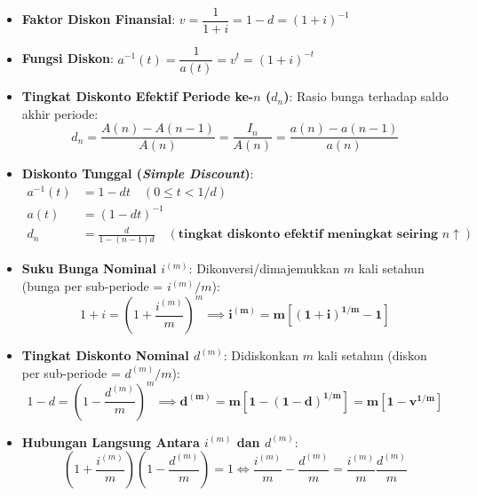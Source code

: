 \documentclass[10pt,a4paper]{article}
\begin{document}
\begin{rumusbox}
\begin{itemize}[leftmargin=1.5em, topsep=1.5pt, itemsep=2pt]
    \item \textbf{Faktor Diskon Finansial}: $v = \dfrac{1}{1+i} = 1 - d = (1+i)^{-1}$
    \item \textbf{Fungsi Diskon}: $a^{-1}(t) = \dfrac{1}{a(t)} = v^t = (1+i)^{-t}$
    \item \textbf{Tingkat Diskonto Efektif Periode ke-$n$ ($d_n$)}: Rasio bunga terhadap saldo akhir periode:
    \begin{equation*}
        d_n = \frac{A(n) - A(n-1)}{A(n)} = \frac{I_n}{A(n)} = \frac{a(n) - a(n-1)}{a(n)}
    \end{equation*}
    \item \textbf{Diskonto Tunggal (\textit{Simple Discount})}:
    \begin{align*}
        a^{-1}(t) &= 1 - dt \quad (0 \le t < 1/d) \\
        a(t) &= (1 - dt)^{-1} \\
        d_n &= \frac{d}{1 - (n-1)d} \quad (\textbf{tingkat diskonto efektif meningkat seiring } n \uparrow)
    \end{align*}
\end{itemize}
\end{rumusbox}

\begin{rumusbox}
\begin{itemize}[leftmargin=1.5em, topsep=1.5pt, itemsep=2pt]
    \item \textbf{Suku Bunga Nominal $i^{(m)}$}: Dikonversi/dimajemukkan $m$ kali setahun (bunga per sub-periode = $i^{(m)}/m$):
    \begin{equation*}
        1 + i = \left( 1 + \frac{i^{(m)}}{m} \right)^m \implies \mathbf{i^{(m)} = m\left[ (1+i)^{1/m} - 1 \right]}
    \end{equation*}
    \item \textbf{Tingkat Diskonto Nominal $d^{(m)}$}: Didiskonkan $m$ kali setahun (diskon per sub-periode = $d^{(m)}/m$):
    \begin{equation*}
        1 - d = \left( 1 - \frac{d^{(m)}}{m} \right)^m \implies \mathbf{d^{(m)} = m\left[ 1 - (1-d)^{1/m} \right] = m\left[ 1 - v^{1/m} \right]}
    \end{equation*}
    \item \textbf{Hubungan Langsung Antara $i^{(m)}$ dan $d^{(m)}$}:
    \begin{equation*}
        \left( 1 + \frac{i^{(m)}}{m} \right) \left( 1 - \frac{d^{(m)}}{m} \right) = 1 \iff \frac{i^{(m)}}{m} - \frac{d^{(m)}}{m} = \frac{i^{(m)}}{m} \frac{d^{(m)}}{m}
    \end{equation*}
\end{itemize}
\end{rumusbox}
\end{document}
